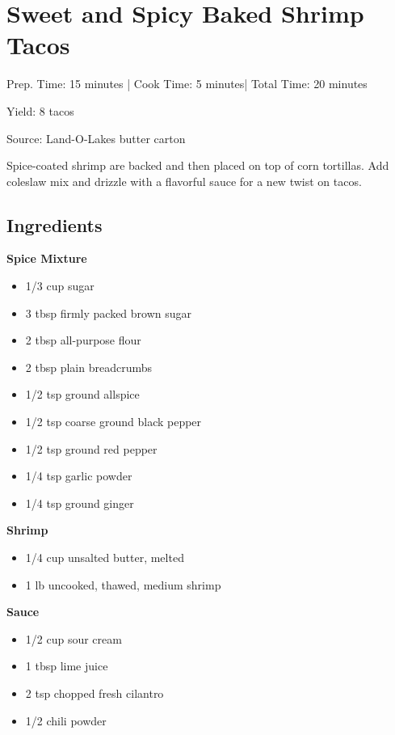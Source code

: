 \section{Sweet and Spicy Baked Shrimp Tacos}

\begin{center}
Prep. Time: 15 minutes |
Cook Time: 5 minutes|
Total Time: 20 minutes
 
Yield: 8 tacos

\vspace{1em}

Source: Land-O-Lakes butter carton\par

\vspace{1em}
Spice-coated shrimp are backed and then placed on top of corn tortillas.
Add coleslaw mix and drizzle with a flavorful sauce for a new twist on tacos.

\end{center}

\subsection{Ingredients}
\textbf{Spice Mixture}
\begin{multicols}{2}
\begin{itemize}
    \item 1/3 cup sugar
    \item 3 tbsp firmly packed brown sugar
    \item 2 tbsp all-purpose flour
    \item 2 tbsp plain breadcrumbs
    \item 1/2 tsp ground allspice
    \item 1/2 tsp coarse ground black pepper
    \item 1/2 tsp ground red pepper
    \item 1/4 tsp garlic powder
    \item 1/4 tsp ground ginger
\end{itemize}
\end{multicols}

\noindent\textbf{Shrimp}
\begin{itemize}
    \item 1/4 cup unsalted butter, melted
    \item 1 lb uncooked, thawed, medium shrimp
\end{itemize}

\noindent\textbf{Sauce}
\begin{itemize}
    \item 1/2 cup sour cream
    \item 1 tbsp lime juice
    \item 2 tsp chopped fresh cilantro
    \item 1/2 chili powder
\end{itemize}

